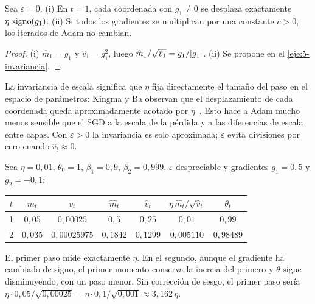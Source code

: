 \begin{proposicion}\label{prop:escala}
Sea $\varepsilon=0$. (i) En $t=1$, cada coordenada con $g_1\ne 0$ se desplaza exactamente $\eta\,\operatorname{signo}(g_1)$. (ii) Si todos los gradientes se multiplican por una constante $c>0$, los iterados de Adam no cambian.
\end{proposicion}

\begin{proof}
(i) $\hat m_1=g_1$ y $\hat v_1=g_1^{2}$, luego $\hat m_1/\sqrt{\hat v_1}=g_1/\lvert g_1\rvert$. (ii) Se propone en el \cref{eje:5-invariancia}.
\end{proof}

La invariancia de escala significa que $\eta$ fija directamente el tamaño del paso en el espacio de parámetros: Kingma y Ba observan que el desplazamiento de cada coordenada queda aproximadamente acotado por $\eta$~\cite[§2.1]{adam}. Esto hace a Adam mucho menos sensible que el SGD a la escala de la pérdida y a las diferencias de escala entre capas. Con $\varepsilon>0$ la invariancia es solo aproximada; $\varepsilon$ evita divisiones por cero cuando $\hat v_t\approx 0$.

\begin{ejemplo}\label{ej:adam}
Sea $\eta=0{,}01$, $\theta_0=1$, $\beta_1=0{,}9$, $\beta_2=0{,}999$, $\varepsilon$ despreciable y gradientes $g_1=0{,}5$ y $g_2=-0{,}1$:
\begin{center}\small
\begin{tabular}{@{}ccccccc@{}}
\toprule
$t$ & $m_t$ & $v_t$ & $\hat m_t$ & $\hat v_t$ & $\eta\,\hat m_t/\sqrt{\hat v_t}$ & $\theta_t$ \\
\midrule
1 & $0{,}05$ & $0{,}00025$ & $0{,}5$ & $0{,}25$ & $0{,}01$ & $0{,}99$ \\
2 & $0{,}035$ & $0{,}00025975$ & $0{,}1842$ & $0{,}1299$ & $0{,}005110$ & $0{,}98489$ \\
\bottomrule
\end{tabular}
\end{center}
El primer paso mide exactamente $\eta$. En el segundo, aunque el gradiente ha cambiado de signo, el primer momento conserva la inercia del primero y $\theta$ sigue disminuyendo, con un paso menor. Sin corrección de sesgo, el primer paso sería $\eta\cdot 0{,}05/\sqrt{0{,}00025}=\eta\cdot 0{,}1/\sqrt{0{,}001}\approx 3{,}162\,\eta$.
\end{ejemplo}


